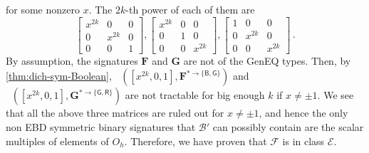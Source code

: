 \documentclass[11pt]{article}
\DeclareMathOperator{\holbs}{Holant^*_2}
\newcommand{\db}{\mathsf{B}}
\newcommand{\dg}{\mathsf{G}}
\newcommand{\dr}{\mathsf{R}}
\newcommand{\geneq}{\textsf{GenEQ}\xspace}
\newcommand{\octgroup}{O_h}
\newcommand{\domres}[1]{
  ^{*\to\{#1\}}
}
\newcommand{\strspt}{\textsf{EBD}\xspace}
\newcommand{\tractBGGRBR}{$\mathscr{E}$\xspace}
\begin{document}
for some nonzero $x$.
The $2k$-th power of each of them are 
\[
  \begin{bmatrix}
    x^{2k} & 0 & 0 \\
    0 & x^{2k} & 0 \\
    0 & 0 & 1
    \end{bmatrix}, \begin{bmatrix}
    x^{2k} & 0 & 0 \\
    0 & 1 & 0 \\
    0 & 0 & x^{2k} 
    \end{bmatrix}, \begin{bmatrix}
    1 & 0 & 0 \\
    0 & x^{2k} & 0 \\
    0 & 0 & x^{2k}
  \end{bmatrix} \, .
\]
By assumption, the signatures $\mathbf{F}$ and $\mathbf{G}$ are not of the \geneq types.
Then, by \cref{thm:dich-sym-Boolean}, $\holbs([x^{2k}, 0, 1], \mathbf{F}\domres{\db, \dg})$ and $\holbs([x^{2k}, 0, 1], \mathbf{G}\domres{\dg, \dr})$ are not tractable for big enough $k$ if $x \ne \pm 1$.
We see that all the above three matrices are ruled out for $x \ne \pm 1$, 
and hence the only non \strspt symmetric binary signatures that $\mathcal{B}'$ can possibly contain are the scalar multiples of elements of $\octgroup$.
Therefore, we have proven that $\mathcal{F}$ is in class \tractBGGRBR.
 

\end{document}
